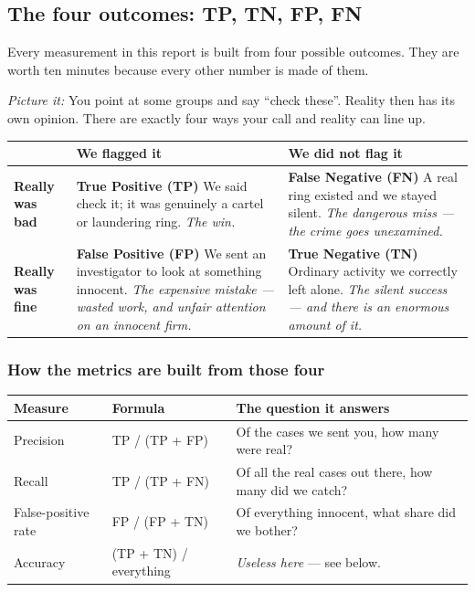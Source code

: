 \documentclass[11pt,a4paper]{article}
\newcommand{\pw}[1]{\textit{\textcolor{accent}{Picture it:}} #1}
\begin{document}
\subsection{The four outcomes: TP, TN, FP, FN}
\label{sec:confusion}

Every measurement in this report is built from four possible outcomes. They are
worth ten minutes because every other number is made of them.

\pw{You point at some groups and say ``check these''. Reality then has its own
opinion. There are exactly four ways your call and reality can line up.}

\begin{center}\small
\begin{tabular}{@{}p{2.3cm}p{6.3cm}p{6.3cm}@{}}
\toprule
 & \textbf{We flagged it} & \textbf{We did not flag it} \\
\midrule
\textbf{Really was bad} &
\textbf{True Positive (TP)} \newline
We said check it; it was genuinely a cartel or laundering ring. \newline
\emph{The win.} &
\textbf{False Negative (FN)} \newline
A real ring existed and we stayed silent. \newline
\emph{The dangerous miss --- the crime goes unexamined.} \\
\addlinespace
\textbf{Really was fine} &
\textbf{False Positive (FP)} \newline
We sent an investigator to look at something innocent. \newline
\emph{The expensive mistake --- wasted work, and unfair attention on an innocent
firm.} &
\textbf{True Negative (TN)} \newline
Ordinary activity we correctly left alone. \newline
\emph{The silent success --- and there is an enormous amount of it.} \\
\bottomrule
\end{tabular}
\end{center}

\subsubsection*{How the metrics are built from those four}

\begin{center}\small
\begin{tabular}{@{}lll@{}}
\toprule
\textbf{Measure} & \textbf{Formula} & \textbf{The question it answers} \\
\midrule
Precision & TP / (TP + FP) &
Of the cases we sent you, how many were real? \\
Recall & TP / (TP + FN) &
Of all the real cases out there, how many did we catch? \\
False-positive rate & FP / (FP + TN) &
Of everything innocent, what share did we bother? \\
Accuracy & (TP + TN) / everything &
\emph{Useless here} --- see below. \\
\bottomrule
\end{tabular}
\end{center}
\end{document}
